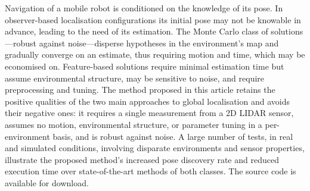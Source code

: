 Navigation of a mobile robot is conditioned on the knowledge of its pose. In
observer-based localisation configurations its initial pose may not be knowable
in advance, leading to the need of its estimation. The Monte Carlo class of
solutions---robust against noise---disperse hypotheses in the environment's map
and gradually converge on an estimate, thus requiring motion and time, which
may be economised on. Feature-based solutions require minimal estimation time
but assume environmental structure, may be sensitive to noise, and require
preprocessing and tuning. The method proposed in this article retains the
positive qualities of the two main approaches to global localisation and avoids
their negative ones: it requires a single measurement from a 2D LIDAR sensor,
assumes no motion, environmental structure, or parameter tuning in a
per-environment basis, and is robust against noise.  A large number of tests,
in real and simulated conditions, involving disparate environments and sensor
properties, illustrate the proposed method's increased pose discovery rate and
reduced execution time over state-of-the-art methods of both classes.
The source code is available for download.
